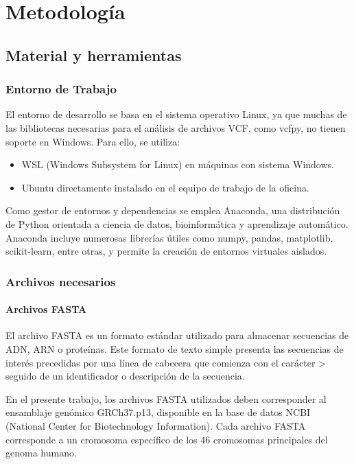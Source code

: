 \documentclass[11pt,spanish,listoffigures,listoftables]{tfgetsinf}
\begin{document}
\chapter{Metodología}


\section{Material y herramientas}

\subsection{Entorno de Trabajo}

El entorno de desarrollo se basa en el sistema operativo Linux, ya que muchas de las bibliotecas necesarias para el análisis de archivos \ac{VCF}, como vcfpy, no tienen soporte en Windows. Para ello, se utiliza:
\begin{itemize}
   \item WSL (Windows Subsystem for Linux) en máquinas con sistema Windows.
   \item Ubuntu directamente instalado en el equipo de trabajo de la oficina.
\end{itemize}

Como gestor de entornos y dependencias se emplea Anaconda, una distribución de Python orientada a ciencia de datos, bioinformática y aprendizaje automático. Anaconda incluye numerosas librerías útiles como numpy, pandas, matplotlib, scikit-learn, entre otras, y permite la creación de entornos virtuales aislados.

\subsection{Archivos necesarios}

\subsubsection{Archivos FASTA}

El archivo \ac{FASTA} es un formato estándar utilizado para almacenar secuencias de \ac{ADN}, \ac{ARN} o proteínas. Este formato de texto simple presenta las secuencias de interés precedidas por una línea de cabecera que comienza con el carácter > seguido de un identificador o descripción de la secuencia. 

En el presente trabajo, los archivos \ac{FASTA} utilizados deben corresponder al ensamblaje genómico GRCh37.p13, disponible en la base de datos \ac{NCBI} (National Center for Biotechnology Information). Cada archivo \ac{FASTA} corresponde a un cromosoma específico de los 46 cromosomas principales del genoma humano. 
\end{document}
